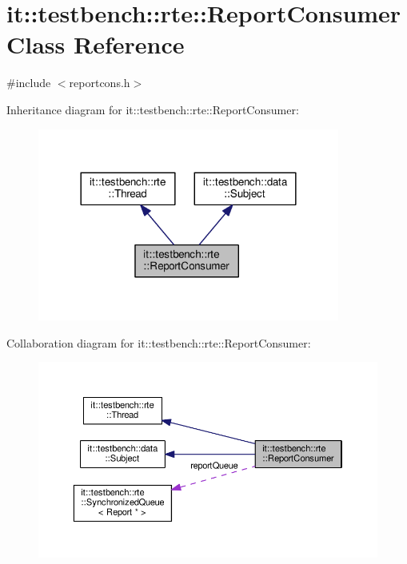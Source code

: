 \hypertarget{classit_1_1testbench_1_1rte_1_1ReportConsumer}{\section{it\-:\-:testbench\-:\-:rte\-:\-:Report\-Consumer Class Reference}
\label{de/d2c/classit_1_1testbench_1_1rte_1_1ReportConsumer}
}


{\ttfamily \#include $<$reportcons.\-h$>$}



Inheritance diagram for it\-:\-:testbench\-:\-:rte\-:\-:Report\-Consumer\-:
\nopagebreak
\begin{figure}[H]
\begin{center}
\leavevmode
\includegraphics[width=281pt]{d1/dba/classit_1_1testbench_1_1rte_1_1ReportConsumer__inherit__graph}
\end{center}
\end{figure}


Collaboration diagram for it\-:\-:testbench\-:\-:rte\-:\-:Report\-Consumer\-:
\nopagebreak
\begin{figure}[H]
\begin{center}
\leavevmode
\includegraphics[width=350pt]{dc/d53/classit_1_1testbench_1_1rte_1_1ReportConsumer__coll__graph}
\end{center}
\end{figure}
